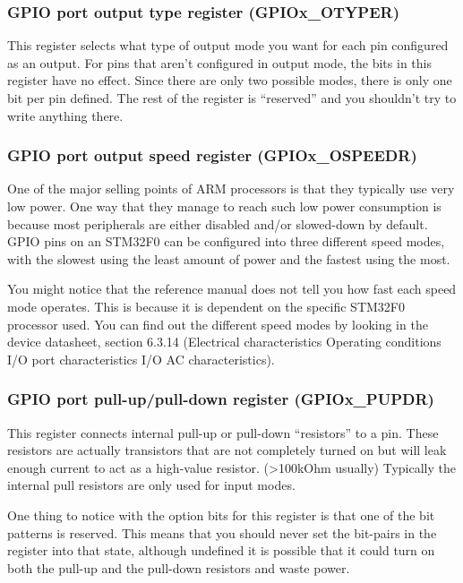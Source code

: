\documentclass[11pt,fleqn]{book} %
\begin{document}
\subsubsection{GPIO port output type register (GPIOx\_OTYPER)}
This register selects what type of output mode you want for each pin configured as an output. For pins that aren't configured in output mode, the bits in this register have no effect. Since there are only two possible modes, there is only one bit per pin defined. The rest of the register is ``reserved'' and you shouldn't try to write anything there.

\subsubsection{GPIO port output speed register (GPIOx\_OSPEEDR)}
One of the major selling points of ARM processors is that they typically use very low power. One way that they manage to reach such low power consumption is because most peripherals are either disabled and/or slowed-down by default. GPIO pins on an STM32F0 can be configured into three different speed modes, with the slowest using the least amount of power and the fastest using the most.

You might notice that the reference manual does not tell you how fast each speed mode operates. This is because it is dependent on the specific STM32F0 processor used. You can find out the different speed modes by looking in the device datasheet, section 6.3.14 (Electrical characteristics \textrightarrow Operating conditions \textrightarrow I/O port characteristics \textrightarrow I/O AC characteristics).

\subsubsection{GPIO port pull-up/pull-down register (GPIOx\_PUPDR)}
This register connects internal pull-up or pull-down ``resistors'' to a pin. These resistors are actually transistors that are not completely turned on but will leak enough current to act as a high-value resistor. (>100kOhm usually) Typically the internal pull resistors are only used for input modes.

One thing to notice with the option bits for this register is that one of the bit patterns is reserved. This means that you should never set the bit-pairs in the register into that state, although undefined it is possible that it could turn on both the pull-up and the pull-down resistors and waste power.
\end{document}
